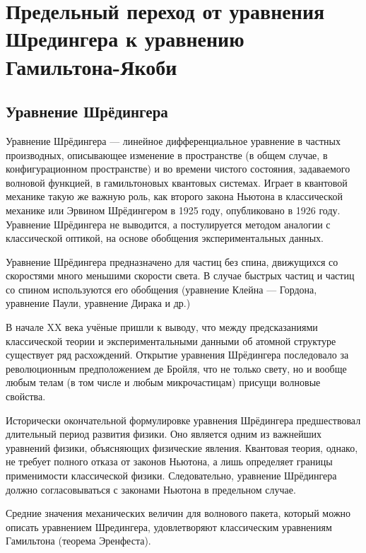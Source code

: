\documentclass[a4paper,14pt,russian]{article}
\renewcommand\contentsname{Projects List} %
\begin{document}
\renewcommand\contentsname{Оглавление}
\tableofcontents
\vspace{\fill}

\newpage

\section{Предельный переход от уравнения Шредингера к уравнению Гамильтона-Якоби}

\subsection{Уравнение Шрёдингера}

Уравнение Шрёдингера — линейное дифференциальное уравнение в частных производных, описывающее изменение в пространстве (в общем случае, в конфигурационном пространстве) и во времени чистого состояния, задаваемого волновой функцией, в гамильтоновых квантовых системах. Играет в квантовой механике такую же важную роль, как второго закона Ньютона в классической механике или Эрвином Шрёдингером в 1925 году, опубликовано в 1926 году. Уравнение Шрёдингера не выводится, а постулируется методом аналогии с классической оптикой, на основе обобщения экспериментальных данных.

Уравнение Шрёдингера предназначено для частиц без спина, движущихся со скоростями много меньшими скорости света. В случае быстрых частиц и частиц со спином используются его обобщения (уравнение Клейна — Гордона, уравнение Паули, уравнение Дирака и др.)

В начале XX века учёные пришли к выводу, что между предсказаниями классической теории и экспериментальными данными об атомной структуре существует ряд расхождений. Открытие уравнения Шрёдингера последовало за революционным предположением де Бройля, что не только свету, но и вообще любым телам (в том числе и любым микрочастицам) присущи волновые свойства.

Исторически окончательной формулировке уравнения Шрёдингера предшествовал длительный период развития физики. Оно является одним из важнейших уравнений физики, объясняющих физические явления. Квантовая теория, однако, не требует полного отказа от законов Ньютона, а лишь определяет границы применимости классической физики. Следовательно, уравнение Шрёдингера должно согласовываться с законами Ньютона в предельном случае.

Средние значения механических величин для волнового пакета, который можно описать уравнением Шредингера, удовлетворяют классическим уравнениям Гамильтона (теорема Эренфеста).
\end{document}
